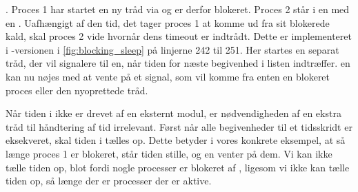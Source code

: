 . Proces 1 har startet en ny tråd via  og er derfor blokeret. Proces 2 står i en  med en . Uafhængigt af den tid, det tager proces 1 at komme ud fra sit blokerede kald, skal proces 2 vide hvornår dens timeout er indtrådt. Dette er implementeret i -versionen i \cref{fig:blocking_sleep} på linjerne 242 til 251. Her startes en separat tråd, der vil signalere til \sched en, når tiden for næste begivenhed i  listen indtræffer. \Sched en kan nu nøjes med at vente på et signal, som vil komme fra enten en blokeret proces eller den nyoprettede tråd.

Når tiden i \des ikke er drevet af en eksternt modul, er nødvendigheden af en ekstra tråd til  håndtering af tid irrelevant. Først når alle begivenheder til et tidsskridt er eksekveret, skal tiden i \des tælles op. Dette betyder i vores konkrete eksempel, at  så længe proces 1 er blokeret, står tiden stille, og  \sched en venter på dem. Vi kan ikke tælle tiden op, blot fordi nogle processer er blokeret af , ligesom vi ikke kan tælle tiden op, så længe der er processer der er aktive. %

